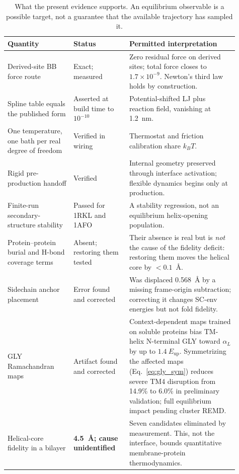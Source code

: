 \documentclass[journal=jctcce,manuscript=article,layout=twocolumn]{achemso}
\begin{document}
\begin{table}[ht]
\centering
\small
\caption{What the present evidence supports. An equilibrium observable is a possible
target, not a guarantee that the available trajectory has sampled it.}
\label{tab:evidence}
\begin{tabular}{
  >{\raggedright\arraybackslash}p{0.26\linewidth}
  >{\raggedright\arraybackslash}p{0.22\linewidth}
  >{\raggedright\arraybackslash}p{0.43\linewidth}}
\toprule
Quantity & Status & Permitted interpretation \\
\midrule
Derived-site BB force route &
Exact; measured &
Zero residual force on derived sites; total force closes to $1.7\times10^{-9}$.
Newton's third law holds by construction. \\
Spline table equals the published form &
Asserted at build time to $10^{-10}$ &
Potential-shifted LJ plus reaction field, vanishing at 1.2~nm. \\
One temperature, one bath per real degree of freedom &
Verified in wiring &
Thermostat and friction calibration share $k_BT$. \\
Rigid pre-production handoff &
Verified &
Internal geometry preserved through interface activation; flexible dynamics begins
only at production. \\
Finite-run secondary-structure stability &
Passed for 1RKL and 1AFO &
A stability regression, not an equilibrium helix-opening population. \\
Protein--protein burial and H-bond coverage terms &
Absent; restoring them tested &
Their absence is real but is \emph{not} the cause of the fidelity deficit: restoring
them moves the helical core by $<0.1$~\AA. \\
Sidechain anchor placement &
Error found and corrected &
Was displaced 0.568~\AA{} by a missing frame-origin subtraction; correcting it
changes SC-env energies but not fold fidelity. \\
GLY Ramachandran maps &
Artifact found and corrected &
Context-dependent maps trained on soluble proteins bias TM-helix N-terminal GLY
toward $\alpha_L$ by up to $1.4~E_\mathrm{up}$. Symmetrizing the affected maps
(Eq.~\ref{eq:gly_sym}) reduces severe TM4 disruption from 14.9\% to 6.0\% in
preliminary validation; full equilibrium impact pending cluster REMD. \\
Helical-core fidelity in a bilayer &
\textbf{4.5~\AA; cause unidentified} &
Seven candidates eliminated by measurement. This, not the interface, bounds
quantitative membrane-protein thermodynamics. \\

\end{tabular}
\end{table}
\end{document}
